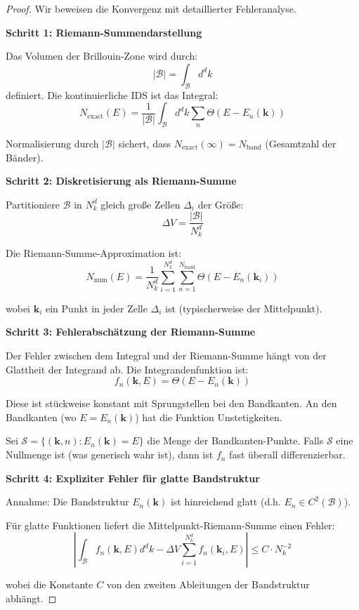 \documentclass[a4paper,12pt]{article}
\theoremstyle{definition}
\begin{document}
\begin{proof}
	Wir beweisen die Konvergenz mit detaillierter Fehleranalyse.
	
	\textbf{Schritt 1: Riemann-Summendarstellung}
	
	Das Volumen der Brillouin-Zone wird durch:
	\[
	|\mathcal{B}| = \int_{\mathcal{B}} d^d k
	\]
	definiert. Die kontinuierliche IDS ist das Integral:
	\[
	N_{\text{exact}}(E) = \frac{1}{|\mathcal{B}|} \int_{\mathcal{B}} d^d k \sum_{n} \Theta(E - E_n(\mathbf{k}))
	\]
	
	Normalisierung durch $|\mathcal{B}|$ sichert, dass $N_{\text{exact}}(\infty) = N_{\text{band}}$ (Gesamtzahl der Bänder).
	
	\textbf{Schritt 2: Diskretisierung als Riemann-Summe}
	
	Partitioniere $\mathcal{B}$ in $N_k^d$ gleich große Zellen $\Delta_i$ der Größe:
	\[
	\Delta V = \frac{|\mathcal{B}|}{N_k^d}
	\]
	
	Die Riemann-Summe-Approximation ist:
	\[
	N_{\text{num}}(E) = \frac{1}{N_k^d} \sum_{i=1}^{N_k^d} \sum_{n=1}^{N_{\text{band}}} \Theta(E - E_n(\mathbf{k}_i))
	\]
	
	wobei $\mathbf{k}_i$ ein Punkt in jeder Zelle $\Delta_i$ ist (typischerweise der Mittelpunkt).
	
	\textbf{Schritt 3: Fehlerabschätzung der Riemann-Summe}
	
	Der Fehler zwischen dem Integral und der Riemann-Summe hängt von der Glattheit der Integrand ab. Die Integrandenfunktion ist:
	\[
	f_n(\mathbf{k}, E) = \Theta(E - E_n(\mathbf{k}))
	\]
	
	Diese ist stückweise konstant mit Sprungstellen bei den Bandkanten. An den Bandkanten (wo $E = E_n(\mathbf{k})$) hat die Funktion Unstetigkeiten.
	
	Sei $\mathcal{S} = \{(\mathbf{k}, n) : E_n(\mathbf{k}) = E\}$ die Menge der Bandkanten-Punkte. Falls $\mathcal{S}$ eine Nullmenge ist (was generisch wahr ist), dann ist $f_n$ fast überall differenzierbar.
	
	\textbf{Schritt 4: Expliziter Fehler für glatte Bandstruktur}
	
	Annahme: Die Bandstruktur $E_n(\mathbf{k})$ ist hinreichend glatt (d.h. $E_n \in C^2(\mathcal{B})$).
	
	Für glatte Funktionen liefert die Mittelpunkt-Riemann-Summe einen Fehler:
	\[
	\left| \int_{\mathcal{B}} f_n(\mathbf{k}, E) d^d k - \Delta V \sum_{i=1}^{N_k^d} f_n(\mathbf{k}_i, E) \right| \leq C \cdot N_k^{-2}
	\]
	
	wobei die Konstante $C$ von den zweiten Ableitungen der Bandstruktur abhängt.
	

\end{proof}
\end{document}
